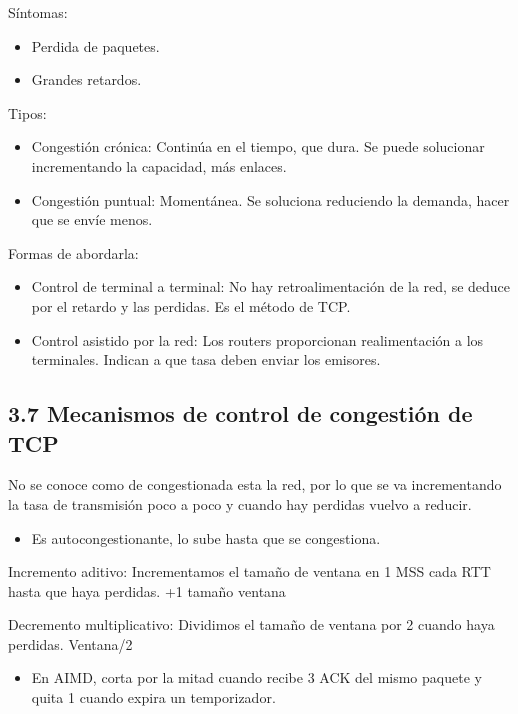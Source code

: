 \documentclass[12pt, twoside, openright]{report} %
\begin{document}
Síntomas:

\begin{itemize}
	\item Perdida de paquetes.
	\item Grandes retardos.
\end{itemize}

Tipos:

\begin{itemize}
	\item Congestión crónica: Continúa en el tiempo, que dura. Se puede
	      solucionar incrementando la capacidad, más enlaces.
	\item Congestión puntual: Momentánea. Se soluciona reduciendo la
	      demanda, hacer que se envíe menos.
\end{itemize}

Formas de abordarla:

\begin{itemize}
	\item Control de terminal a terminal: No hay retroalimentación de la
	      red, se deduce por el retardo y las perdidas. Es el método de TCP.
	\item Control asistido por la red: Los routers proporcionan
	      realimentación a los terminales. Indican a que tasa deben enviar
	      los emisores.
\end{itemize}

\subsection{3.7 Mecanismos de control de congestión de TCP}


No se conoce como de congestionada esta la red, por lo que se va
incrementando la tasa de transmisión poco a poco y cuando hay
perdidas vuelvo a reducir.

\begin{itemize}
	\item Es autocongestionante, lo sube hasta que se congestiona.
\end{itemize}

Incremento aditivo: Incrementamos el tamaño de ventana en 1 MSS cada
RTT hasta que haya perdidas. +1 tamaño ventana

Decremento multiplicativo: Dividimos el tamaño de ventana por 2
cuando haya perdidas. Ventana/2

\begin{itemize}
	\item En AIMD, corta por la mitad cuando recibe 3 ACK del mismo paquete
	      y quita 1 cuando expira un temporizador.
\end{itemize}
\end{document}
